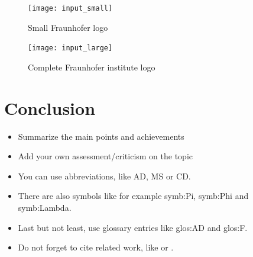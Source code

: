 \documentclass[12pt]%
{article}
\begin{document}
\begin{figure}[h]
    \centering
    \texttt{[image: input\_small]}
    \caption{Small Fraunhofer logo}
    \label{fig:logo_short}
\end{figure}


\begin{figure}[h]
    \centering
    \texttt{[image: input\_large]}
    \caption{Complete Fraunhofer institute logo}
    \label{fig:logo_long}
\end{figure}

\newpage
\section{Conclusion}

\begin{itemize}
\item Summarize the main points and achievements
\item Add your own assessment/criticism on the topic
\end{itemize}



\begin{itemize}
\item You can use abbreviations, like \gls{AD}, \gls{MS} or \gls{CD}.
\item There are also symbols like for example \gls{symb:Pi}, \gls{symb:Phi} and \gls{symb:Lambda}.
\item Last but not least, use glossary entries like \gls{glos:AD} and \gls{glos:F}.
\item Do not forget to cite related work, like \cite{okman2011security} or \cite{borthakur2011apache}.
\end{itemize}
\newpage

\printglossary[style=altlist,title=Glossary]
 
\printglossary[type=\acronymtype,style=long]
 
\printglossary[type=symbolslist,style=long]

\newpage



\end{document}
